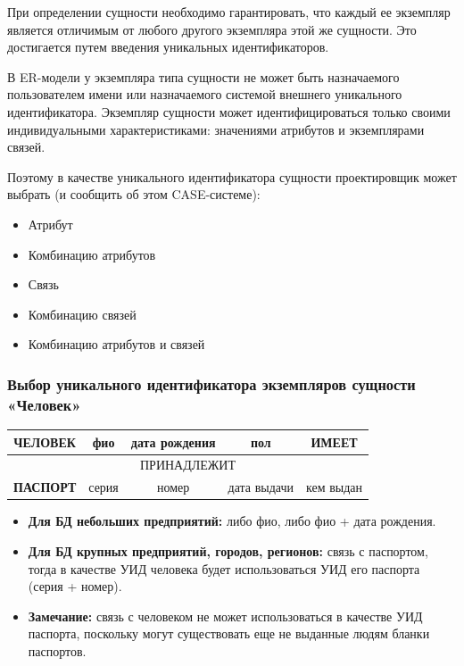 \documentclass[a4paper,12pt]{article}
\begin{document}
При определении сущности необходимо гарантировать, что каждый ее экземпляр является отличимым от любого другого экземпляра этой же сущности. Это достигается путем введения уникальных идентификаторов.

В ER-модели у экземпляра типа сущности не может быть назначаемого пользователем имени или назначаемого системой внешнего уникального идентификатора. Экземпляр сущности может идентифицироваться только своими индивидуальными характеристиками: значениями атрибутов и экземплярами связей.

Поэтому в качестве уникального идентификатора сущности проектировщик может выбрать (и сообщить об этом CASE-системе):
\begin{itemize}
    \item Атрибут
    \item Комбинацию атрибутов
    \item Связь
    \item Комбинацию связей
    \item Комбинацию атрибутов и связей
\end{itemize}

\subsubsection{Выбор уникального идентификатора экземпляров сущности «Человек»}

\begin{center}
    \begin{tabular}{|c|c|c|c|c|}
        \hline
        \textbf{ЧЕЛОВЕК} & фио & дата рождения & пол & \textbf{ИМЕЕТ} \\
        \hline
        \multicolumn{5}{|c|}{ПРИНАДЛЕЖИТ} \\
        \hline
        \textbf{ПАСПОРТ} & серия & номер & дата выдачи & кем выдан \\
        \hline
    \end{tabular}
\end{center}

\begin{itemize}
    \item \textbf{Для БД небольших предприятий:} либо фио, либо фио + дата рождения.
    \item \textbf{Для БД крупных предприятий, городов, регионов:} связь с паспортом, тогда в качестве УИД человека будет использоваться УИД его паспорта (серия + номер).
    \item \textbf{Замечание:} связь с человеком не может использоваться в качестве УИД паспорта, поскольку могут существовать еще не выданные людям бланки паспортов.
\end{itemize}
\end{document}
